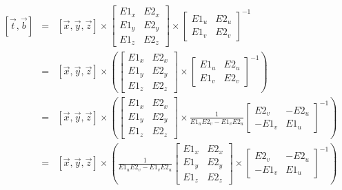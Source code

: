 \documentclass[12pt]{article}
\begin{document}
    \begin{eqnarray*}
        \left[ \overrightarrow{t}, \overrightarrow{b} \right]       
        & = &
        \left[ \overrightarrow{x}, \overrightarrow{y}, \overrightarrow{z} \right]       
        \times
        \left[ \begin{array}{cc}
            E1_x & E2_x \\
            E1_y & E2_y \\
            E1_z & E2_z
        \end{array} \right]
        \times
        \left[ \begin{array}{cc}
            E1_u & E2_u \\
            E1_v & E2_v
        \end{array} \right]^{-1} \\
        & = &
        \left[ \overrightarrow{x}, \overrightarrow{y}, \overrightarrow{z} \right]       
        \times
        \left(
            \left[ \begin{array}{cc}
                E1_x & E2_x \\
                E1_y & E2_y \\
                E1_z & E2_z
            \end{array} \right]
            \times
            \left[ \begin{array}{cc}
                E1_u & E2_u \\
                E1_v & E2_v
            \end{array} \right]^{-1}
        \right) \\
        & = &
        \left[ \overrightarrow{x}, \overrightarrow{y}, \overrightarrow{z} \right]       
        \times
        \left(
            \left[ \begin{array}{cc}
                E1_x & E2_x \\
                E1_y & E2_y \\
                E1_z & E2_z
            \end{array} \right]
            \times
            \frac{1}{E1_uE2_v-E1_vE2_u}
            \left[ \begin{array}{cc}
                 E2_v & -E2_u \\
                -E1_v &  E1_u
            \end{array} \right]^{-1}
        \right) \\
        & = &
        \left[ \overrightarrow{x}, \overrightarrow{y}, \overrightarrow{z} \right]       
        \times
        \left(
            \frac{1}{E1_uE2_v-E1_vE2_u}
            \left[ \begin{array}{cc}
                E1_x & E2_x \\
                E1_y & E2_y \\
                E1_z & E2_z
            \end{array} \right]
            \times
            \left[ \begin{array}{cc}
                 E2_v & -E2_u \\
                -E1_v &  E1_u
            \end{array} \right]^{-1}
        \right)
    \end{eqnarray*}
\end{document}

